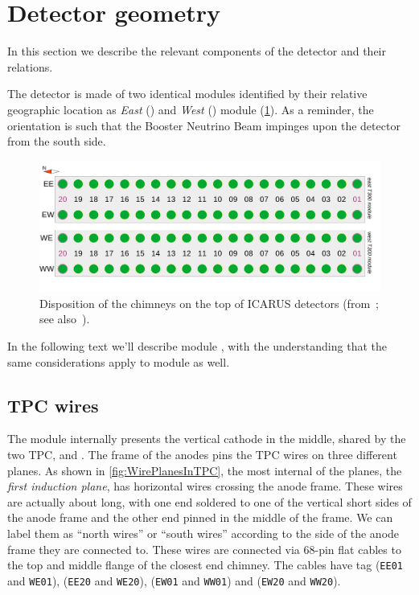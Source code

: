 \section{Detector geometry}
\label{sec:geometry}

In this section we describe the relevant components of the detector and their relations.

The detector is made of two identical modules
identified by their relative geographic location
as \emph{East} () and \emph{West} () module (\cref{fig:chimneys}).
As a reminder, the orientation is such that the Booster Neutrino Beam impinges
upon the detector from the south side.

\begin{figure}[bt] %
  \includegraphics[width=\textwidth]{figures/ChimneyMap}
  \caption{
    Disposition of the chimneys on the top of ICARUS detectors (from~\cite{SBNDocDB14316}; see also~\cite{SBNDocDBxxxx:ConnTest}).
    \label{fig:chimneys}
  }
\end{figure}

In the following text we'll describe module ,
with the understanding that the same considerations apply to module  as well.


\subsection{TPC wires}
\label{ssec:geometry:wires}

The module internally presents the vertical cathode in the middle, shared by
the two TPC,  and .
The frame of the anodes pins the TPC wires on three different planes.
As shown in \cref{fig:WirePlanesInTPC}, the most internal of the planes,
the \emph{first induction plane}, has horizontal wires crossing the anode frame.
These wires are actually about  long,
with one end soldered to one of the vertical short sides of the anode frame
and the other end pinned in the middle of the frame.
We can label them as ``north wires'' or ``south wires''
according to the side of the anode frame they are connected to.
These wires are connected via 68-pin flat cables to the top and middle flange
of the closest end chimney.
The cables have tag
 (\texttt{EE01} and \texttt{WE01}),
 (\texttt{EE20} and \texttt{WE20}),
 (\texttt{EW01} and \texttt{WW01})
and
 (\texttt{EW20} and \texttt{WW20}).

